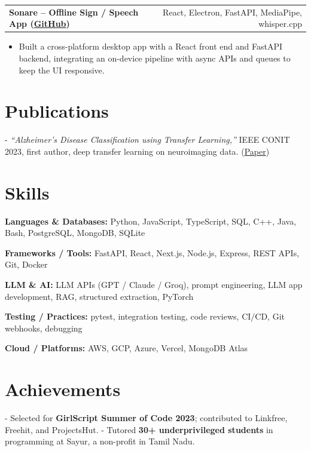 \documentclass[letterpaper,11pt]{article}
\makeatletter
\newcommand{\projItem}[2]{%
  \vspace{6pt}
  \begin{tabular*}{\textwidth}{@{}l@{\extracolsep{\fill}}r@{}}
    \textbf{#1} & #2 \\
  \end{tabular*}\par\vspace{-2pt}
}
\newcommand{\skillLine}[2]{\textbf{#1:} #2\par\vspace{2pt}}
\newcommand{\inlineBlock}[1]{{\setlength{\leftskip}{0.18in}\small #1\par}}
\makeatother
\begin{document}
\projItem{Sonare -- Offline Sign / Speech App {\normalfont\small(\href{https://github.com/Deva-1903/Qualcomm-Sep25-Team-Sonare}{GitHub})}}{React, Electron, FastAPI, MediaPipe, whisper.cpp}
\begin{itemize}
  \item Built a cross-platform desktop app with a React front end and FastAPI backend, integrating an on-device pipeline with async APIs and queues to keep the UI responsive.
\end{itemize}

\section{Publications}
\inlineBlock{- \textit{``Alzheimer's Disease Classification using Transfer Learning,''} IEEE CONIT 2023, first author, deep transfer learning on neuroimaging data. {\normalfont\small(\href{https://ieeexplore.ieee.org/document/10205760}{Paper})}}

\section{Skills}
\skillLine{Languages \& Databases}{Python, JavaScript, TypeScript, SQL, C++, Java, Bash, PostgreSQL, MongoDB, SQLite}
\skillLine{Frameworks / Tools}{FastAPI, React, Next.js, Node.js, Express, REST APIs, Git, Docker}
\skillLine{LLM \& AI}{LLM APIs (GPT / Claude / Groq), prompt engineering, LLM app development, RAG, structured extraction, PyTorch}
\skillLine{Testing / Practices}{pytest, integration testing, code reviews, CI/CD, Git webhooks, debugging}
\skillLine{Cloud / Platforms}{AWS, GCP, Azure, Vercel, MongoDB Atlas}

\section{Achievements}
\inlineBlock{- Selected for \textbf{GirlScript Summer of Code 2023}; contributed to Linkfree, Freehit, and ProjectsHut. - Tutored \textbf{30+ underprivileged students} in programming at Sayur, a non-profit in Tamil Nadu.}
\end{document}
